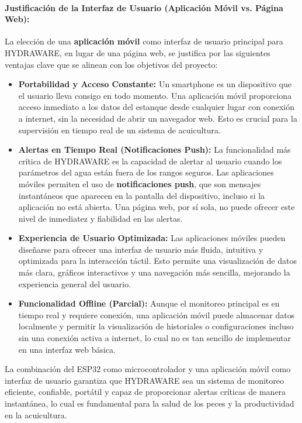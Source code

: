 \documentclass[a4paper,12pt]{article}
\begin{document}
	\paragraph{Justificación de la Interfaz de Usuario (Aplicación Móvil vs. Página Web):}
	La elección de una \textbf{aplicación móvil} como interfaz de usuario principal para HYDRAWARE, en lugar de una página web, se justifica por las siguientes ventajas clave que se alinean con los objetivos del proyecto:
	
	\begin{itemize}
		\item \textbf{Portabilidad y Acceso Constante:} Un smartphone es un dispositivo que el usuario lleva consigo en todo momento. Una aplicación móvil proporciona acceso inmediato a los datos del estanque desde cualquier lugar con conexión a internet, sin la necesidad de abrir un navegador web. Esto es crucial para la supervisión en tiempo real de un sistema de acuicultura.
		
		\item \textbf{Alertas en Tiempo Real (Notificaciones Push):} La funcionalidad más crítica de HYDRAWARE es la capacidad de alertar al usuario cuando los parámetros del agua están fuera de los rangos seguros. Las aplicaciones móviles permiten el uso de \textbf{notificaciones push}, que son mensajes instantáneos que aparecen en la pantalla del dispositivo, incluso si la aplicación no está abierta. Una página web, por sí sola, no puede ofrecer este nivel de inmediatez y fiabilidad en las alertas.
		
		\item \textbf{Experiencia de Usuario Optimizada:} Las aplicaciones móviles pueden diseñarse para ofrecer una interfaz de usuario más fluida, intuitiva y optimizada para la interacción táctil. Esto permite una visualización de datos más clara, gráficos interactivos y una navegación más sencilla, mejorando la experiencia general del usuario.
		
		\item \textbf{Funcionalidad Offline (Parcial):} Aunque el monitoreo principal es en tiempo real y requiere conexión, una aplicación móvil puede almacenar datos localmente y permitir la visualización de historiales o configuraciones incluso sin una conexión activa a internet, lo cual no es tan sencillo de implementar en una interfaz web básica.
	\end{itemize}
	
	La combinación del ESP32 como microcontrolador y una aplicación móvil como interfaz de usuario garantiza que HYDRAWARE sea un sistema de monitoreo eficiente, confiable, portátil y capaz de proporcionar alertas críticas de manera instantánea, lo cual es fundamental para la salud de los peces y la productividad en la acuicultura.
	
\end{document}
